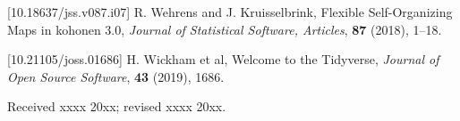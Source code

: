 \documentclass{aims}
\theoremstyle{definition}
\begin{document}
\begin{thebibliography}{99}
 [10.18637/jss.v087.i07]
     \newblock R. Wehrens and J. Kruisselbrink,
     \newblock  Flexible Self-Organizing Maps in kohonen 3.0,
     \newblock \emph{Journal of Statistical Software, Articles}, \textbf{87} (2018), 1--18.

 [10.21105/joss.01686]
     \newblock H. Wickham et al,
     \newblock  Welcome to the Tidyverse,
     \newblock \emph{Journal of Open Source Software}, \textbf{43} (2019), 1686.

\end{thebibliography}

\medskip
Received xxxx 20xx; revised xxxx 20xx.
\medskip
\end{document}

